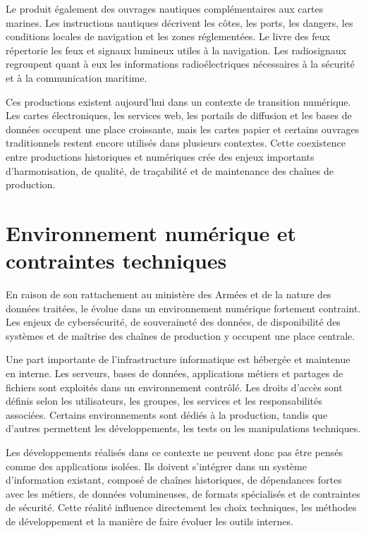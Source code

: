Le  produit également des ouvrages nautiques complémentaires aux cartes marines. Les instructions nautiques décrivent les côtes, les ports, les dangers, les conditions locales de navigation et les zones réglementées. Le livre des feux répertorie les feux et signaux lumineux utiles à la navigation. Les radiosignaux regroupent quant à eux les informations radioélectriques nécessaires à la sécurité et à la communication maritime.

Ces productions existent aujourd'hui dans un contexte de transition numérique. Les cartes électroniques, les services web, les portails de diffusion et les bases de données occupent une place croissante, mais les cartes papier et certains ouvrages traditionnels restent encore utilisés dans plusieurs contextes. Cette coexistence entre productions historiques et numériques crée des enjeux importants d'harmonisation, de qualité, de traçabilité et de maintenance des chaînes de production.

\section{Environnement numérique et contraintes techniques}

En raison de son rattachement au ministère des Armées et de la nature des données traitées, le  évolue dans un environnement numérique fortement contraint. Les enjeux de cybersécurité, de souveraineté des données, de disponibilité des systèmes et de maîtrise des chaînes de production y occupent une place centrale.

Une part importante de l'infrastructure informatique est hébergée et maintenue en interne. Les serveurs, bases de données, applications métiers et partages de fichiers sont exploités dans un environnement contrôlé. Les droits d'accès sont définis selon les utilisateurs, les groupes, les services et les responsabilités associées. Certains environnements sont dédiés à la production, tandis que d'autres permettent les développements, les tests ou les manipulations techniques.

Les développements réalisés dans ce contexte ne peuvent donc pas être pensés comme des applications isolées. Ils doivent s'intégrer dans un système d'information existant, composé de chaînes historiques, de dépendances fortes avec les métiers, de données volumineuses, de formats spécialisés et de contraintes de sécurité. Cette réalité influence directement les choix techniques, les méthodes de développement et la manière de faire évoluer les outils internes.

